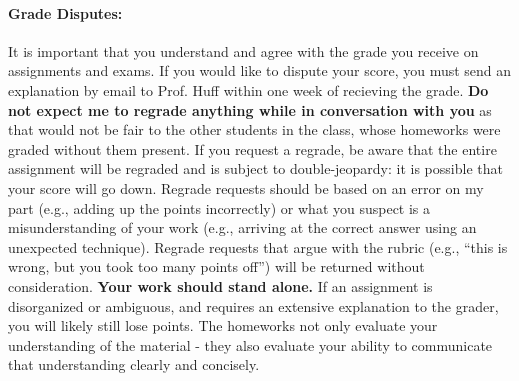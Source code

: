 \documentclass[11pt, a4paper]{article}
\begin{document}
\paragraph{Grade Disputes:} It is important that you understand and agree
        with the grade you receive on assignments and exams. If you would like
        to dispute your score, you must send an explanation by email to Prof.
        Huff within one week of recieving the grade.
        \textbf{Do not expect me to regrade anything while in conversation with
        you} as that would not be fair to the other students in the class, whose
        homeworks were graded without them present.  If you request a regrade,
        be aware that the entire assignment will be regraded and is subject to
        double-jeopardy: it is possible that your score will go down.
        Regrade requests should be based on an error on my part (e.g., adding
        up the points incorrectly) or what you suspect is a misunderstanding of
        your work (e.g., arriving at the correct answer using an unexpected
        technique). Regrade requests that argue with the rubric (e.g., ``this is
        wrong, but you took too many points off'') will be returned without
        consideration.
        \textbf{Your work should stand alone.} If an assignment is disorganized or
        ambiguous, and requires an extensive explanation to the grader, you
        will likely still lose points. The homeworks not only evaluate your
        understanding of the material - they also evaluate your ability to
        communicate that understanding clearly and concisely.
\end{document}
